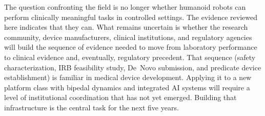 The question confronting the field is no longer whether humanoid robots can
perform clinically meaningful tasks in controlled settings. The evidence reviewed
here indicates that they can. What remains uncertain is whether the research
community, device manufacturers, clinical institutions, and regulatory agencies
will build the sequence of evidence needed to move from laboratory performance to
clinical evidence and, eventually, regulatory precedent. That sequence (safety
characterization, IRB feasibility study, De~Novo submission, and predicate device
establishment) is familiar in medical device development. Applying it to a new
platform class with bipedal dynamics and integrated AI systems will require a
level of institutional coordination that has not yet emerged. Building that
infrastructure is the central task for the next five years.

